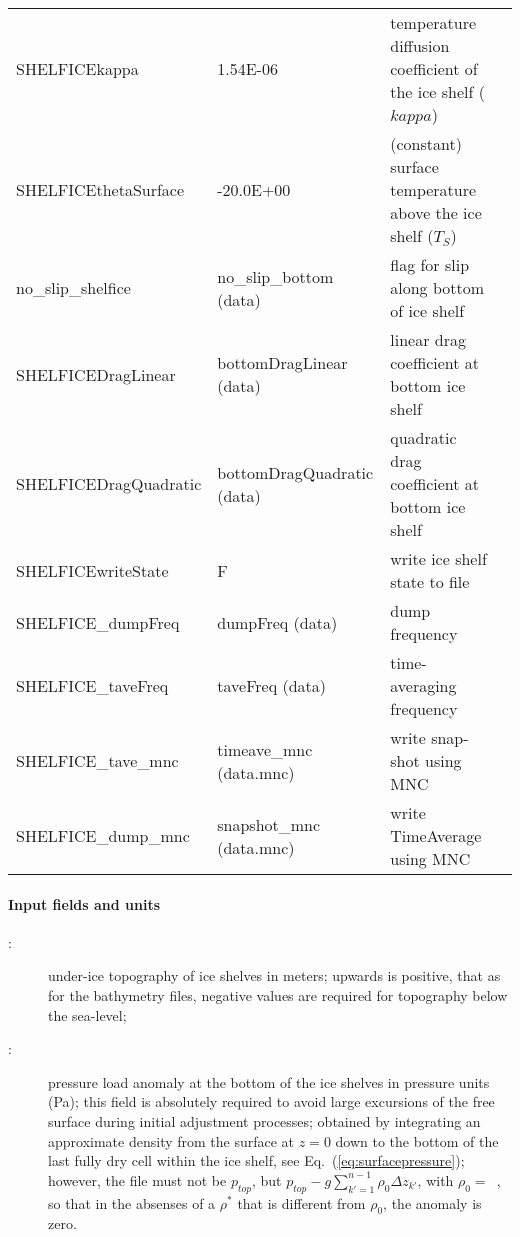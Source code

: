 \begin{table}[!ht]
{\begin{tabular}{|lp{4cm}p{4cm}c|}
      SHELFICEkappa            &   1.54E-06
      &   temperature diffusion coefficient of the ice shelf ($kappa$)
      &  %
      \\
      SHELFICEthetaSurface     &  -20.0E+00
      &   (constant) surface temperature above the ice shelf ($T_{S}$)
      &  %
      \\
      no\_slip\_shelfice       & no\_slip\_bottom (data)
      &   flag for slip along bottom of ice shelf
      &  %
      \\
      SHELFICEDragLinear       & bottomDragLinear (data)
      &   linear drag coefficient at bottom ice shelf
      &  %
      \\
      SHELFICEDragQuadratic    & bottomDragQuadratic (data)
      &   quadratic drag coefficient at bottom ice shelf
      &  %
      \\
      SHELFICEwriteState       & F
      &   write ice shelf state to file 
      &  %
      \\
      SHELFICE\_dumpFreq       & dumpFreq (data)
      &   dump frequency
      &  %
      \\
      SHELFICE\_taveFreq       & taveFreq (data)
      &   time-averaging frequency 
      &  %
      \\
      SHELFICE\_tave\_mnc      & timeave\_mnc (data.mnc)
      &   write snap-shot   using MNC 
      &  %
      \\
      SHELFICE\_dump\_mnc      & snapshot\_mnc (data.mnc)
      &   write TimeAverage using MNC 
      &  %
      \\
\hline
\end{tabular}
}
\end{table}

\paragraph{Input fields and units\label{sec:pkg:shelfice:fields_units}}

\begin{description}
\item[:] under-ice topography of ice shelves in
  meters; upwards is positive, that as for the bathymetry files,
  negative values are required for topography below the sea-level;
\item[:] pressure load anomaly at the bottom of
  the ice shelves in pressure units (Pa); this field is absolutely
  required to avoid large excursions of the free surface during
  initial adjustment processes; obtained by integrating an approximate
  density from the surface at $z=0$ down to the bottom of the last
  fully dry cell within the ice shelf, see 
  Eq.~(\ref{eq:surfacepressure}); however, the file
   must not be $p_{top}$, but
  $p_{top}-g\sum_{k'=1}^{n-1}\rho_{0}\Delta{z}_{k'}$, with
  $\rho_{0}=$~, so that in the absenses of a $\rho^{*}$
  that is different from $\rho_{0}$, the anomaly is zero.
\end{description}

